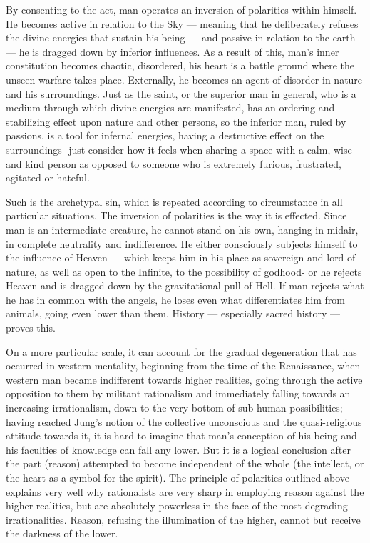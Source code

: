 By consenting to the act, man operates an inversion of polarities within himself. He becomes active in relation to the Sky --- meaning that he deliberately refuses the divine energies that sustain his being --- and passive in relation to the earth --- he is dragged down by inferior influences. As a result of this, man's inner constitution becomes chaotic, disordered, his heart is a battle ground where the unseen warfare takes place. Externally, he becomes an agent of disorder in nature and his surroundings. Just as the saint, or the superior man in general, who is a medium through which divine energies are manifested, has an ordering and stabilizing effect upon nature and other persons, so the inferior man, ruled by passions, is a tool for infernal energies, having a destructive effect on the surroundings- just consider how it feels when sharing a space with a calm, wise and kind person as opposed to someone who is extremely furious, frustrated, agitated or hateful.

Such is the archetypal sin, which is repeated according to circumstance in all particular situations. The inversion of polarities is the way it is effected. Since man is an intermediate creature, he cannot stand on his own, hanging in midair, in complete neutrality and indifference. He either consciously subjects himself to the influence of Heaven --- which keeps him in his place as sovereign and lord of nature, as well as open to the Infinite, to the possibility of godhood- or he rejects Heaven and is dragged down by the gravitational pull of Hell. If man rejects what he has in common with the angels, he loses even what differentiates him from animals, going even lower than them. History --- especially sacred history --- proves this.

On a more particular scale, it can account for the gradual degeneration that has occurred in western mentality, beginning from the time of the Renaissance, when western man became indifferent towards higher realities, going through the active opposition to them by militant rationalism and immediately falling towards an increasing irrationalism, down to the very bottom of sub-human possibilities; having reached Jung's notion of the collective unconscious and the quasi-religious attitude towards it, it is hard to imagine that man's conception of his being and his faculties of knowledge can fall any lower. But it is a logical conclusion after the part (reason) attempted to become independent of the whole (the intellect, or the heart as a symbol for the spirit). The principle of polarities outlined above explains very well why rationalists are very sharp in employing reason against the higher realities, but are absolutely powerless in the face of the most degrading irrationalities. Reason, refusing the illumination of the higher, cannot but receive the darkness of the lower.

